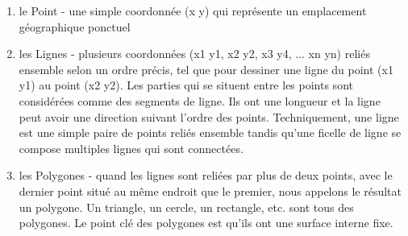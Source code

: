 \begin{enumerate} 
\item le Point - une simple coordonnée (x y) qui représente un emplacement géographique ponctuel 
\item les Lignes - plusieurs coordonnées (x1 y1, x2 y2, x3 y4, ... xn yn) reliés ensemble selon un ordre précis, tel que pour dessiner une ligne du point (x1 y1) au point (x2 y2). Les parties qui se situent entre les points sont considérées comme des segments de ligne. Ils ont une longueur et la ligne peut avoir une direction suivant l'ordre des points. Techniquement, une ligne est une simple paire de points reliés ensemble tandis qu'une ficelle de ligne se compose multiples lignes qui sont connectées.
\item les Polygones - quand les lignes sont reliées par plus de deux points, avec le dernier point situé au même endroit que le premier, nous appelons le résultat un polygone. Un triangle, un cercle, un rectangle, etc. sont tous des polygones. Le point clé des polygones est qu'ils ont une surface interne fixe.
\end{enumerate}
